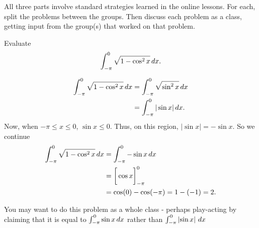 \documentclass[noinstructornotes]{ximera}
\begin{document}
\begin{instructorNotes}
All three parts involve standard strategies learned in the online lessons.  
For each, split the problems between the groups.  
Then discuss each problem as a class, getting input from the group(s) that worked on that problem.
\end{instructorNotes}







\begin{problem}
Evaluate
	\[
	\int_{- \pi}^0 \sqrt{1 - \cos^2 x} \,d x.
	\]
	\begin{freeResponse}
		\begin{align*}
		\int_{- \pi}^0 \sqrt{1 - \cos^2 x} \,d x
		&= \int_{- \pi}^0 \sqrt{\sin^2 x} \,d x  \\
		&= \int_{- \pi}^0 | \sin x | \,d x.
		\end{align*}
	Now, when $-\pi \leq x \leq 0$, $\sin x \leq 0$.  
	Thus, on this region, $|\sin x | = - \sin x$.
	So we continue
		\begin{align*}
		\int_{- \pi}^0 \sqrt{1 - \cos^2 x} \,d x
		&= \int_{- \pi}^0 - \sin x \,d x  \\
		&= \bigg[ \cos x \bigg]_{-\pi}^0  \\
		&= \cos(0) - \cos(-\pi) = 1 - (-1) = 2.
		\end{align*}
	\end{freeResponse}
		
\end{problem}

\begin{instructorNotes}
You may want to do this problem as a whole class - perhaps play-acting by claiming that it is equal to $\int_{-\pi}^0 \sin x \,d x$ rather than $\int_{-\pi}^0 \left| \sin x \right|  \,d x$
\end{instructorNotes}
\end{document}

